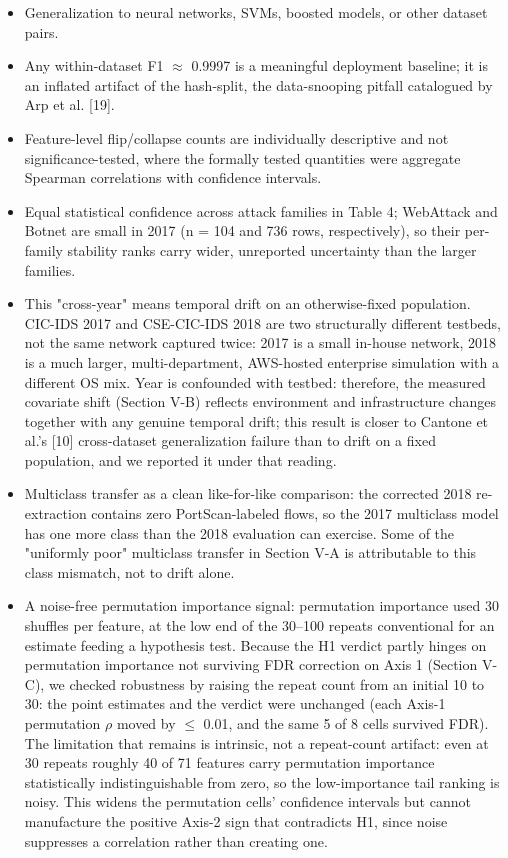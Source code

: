 \documentclass[conference]{IEEEtran}
\begin{document}
\begin{itemize}[leftmargin=*,itemsep=2pt,topsep=2pt]
  \item Generalization to neural networks, SVMs, boosted models, or other dataset pairs.
  \item Any within-dataset F1 $\approx$ 0.9997 is a meaningful deployment baseline; it is an inflated artifact of the hash-split, the data-snooping pitfall catalogued by Arp et al. [19].
  \item Feature-level flip/collapse counts are individually descriptive and not significance-tested, where the formally tested quantities were aggregate Spearman correlations with confidence intervals.
  \item Equal statistical confidence across attack families in Table 4; WebAttack and Botnet are small in 2017 (n = 104 and 736 rows, respectively), so their per-family stability ranks carry wider, unreported uncertainty than the larger families.
  \item This "cross-year" means temporal drift on an otherwise-fixed population. CIC-IDS 2017 and CSE-CIC-IDS 2018 are two structurally different testbeds, not the same network captured twice: 2017 is a small in-house network, 2018 is a much larger, multi-department, AWS-hosted enterprise simulation with a different OS mix. Year is confounded with testbed: therefore, the measured covariate shift (Section V-B) reflects environment and infrastructure changes together with any genuine temporal drift; this result is closer to Cantone et al.'s [10] cross-dataset generalization failure than to drift on a fixed population, and we reported it under that reading.
  \item Multiclass transfer as a clean like-for-like comparison: the corrected 2018 re-extraction contains zero PortScan-labeled flows, so the 2017 multiclass model has one more class than the 2018 evaluation can exercise. Some of the "uniformly poor" multiclass transfer in Section V-A is attributable to this class mismatch, not to drift alone.
  \item A noise-free permutation importance signal: permutation importance used 30 shuffles per feature, at the low end of the 30--100 repeats conventional for an estimate feeding a hypothesis test. Because the H1 verdict partly hinges on permutation importance not surviving FDR correction on Axis 1 (Section V-C), we checked robustness by raising the repeat count from an initial 10 to 30: the point estimates and the verdict were unchanged (each Axis-1 permutation $\rho$ moved by $\leq$ 0.01, and the same 5 of 8 cells survived FDR). The limitation that remains is intrinsic, not a repeat-count artifact: even at 30 repeats roughly 40 of 71 features carry permutation importance statistically indistinguishable from zero, so the low-importance tail ranking is noisy. This widens the permutation cells' confidence intervals but cannot manufacture the positive Axis-2 sign that contradicts H1, since noise suppresses a correlation rather than creating one.

\end{itemize}
\end{document}

